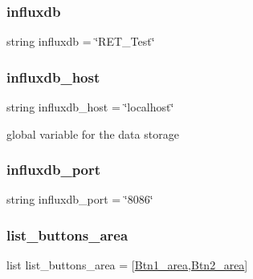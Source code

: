 \subsubsection{\texorpdfstring{influxdb}{influxdb}}
{\footnotesize\ttfamily string influxdb = \char`\"{}R\+E\+T\+\_\+\+Test\char`\"{}}

\mbox{\label{namespaceRET__config_a5ad590543d5ae7b0a89b3681d33928d8}} 
\subsubsection{\texorpdfstring{influxdb\+\_\+host}{influxdb\_host}}
{\footnotesize\ttfamily string influxdb\+\_\+host = \char`\"{}localhost\char`\"{}}



global variable for the data storage 

\mbox{\label{namespaceRET__config_a91cab5b28cd6867b74e2cb9f887b2948}} 
\subsubsection{\texorpdfstring{influxdb\+\_\+port}{influxdb\_port}}
{\footnotesize\ttfamily string influxdb\+\_\+port = \char`\"{}8086\char`\"{}}

\mbox{\label{namespaceRET__config_a25b4602337319d65f44337e6ad1b0487}} 
\subsubsection{\texorpdfstring{list\+\_\+buttons\+\_\+area}{list\_buttons\_area}}
{\footnotesize\ttfamily list list\+\_\+buttons\+\_\+area = \mbox{[}\hyperlink{namespaceRET__config_a118140d2896d1aff1e3c9355f9deb314}{Btn1\+\_\+area},\hyperlink{namespaceRET__config_a51a4083768cbc17b22a98ad63a7bf851}{Btn2\+\_\+area}\mbox{]}}

